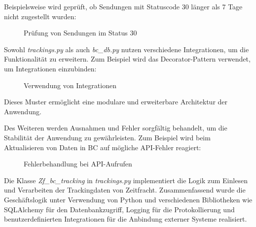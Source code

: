 Beispielsweise wird geprüft, ob Sendungen mit Statuscode 30 länger als 7 Tage nicht zugestellt wurden:

\begin{figure}[htb]
    \centering
    \caption{Prüfung von Sendungen im Status 30}
    \label{fig:viewStatus}
\end{figure}


Sowohl \textit{trackings.py} als auch \textit{bc\_db.py} nutzen verschiedene Integrationen, um die Funktionalität zu erweitern. 
Zum Beispiel wird das Decorator-Pattern verwendet, um Integrationen einzubinden:

\begin{figure}[htb]
    \centering
    \caption{Verwendung von Integrationen}
    \label{fig:Integrationen}
\end{figure}


Dieses Muster ermöglicht eine modulare und erweiterbare Architektur der Anwendung.



Des Weiteren werden Ausnahmen und Fehler sorgfältig behandelt, um die Stabilität der Anwendung zu gewährleisten. 
Zum Beispiel wird beim Aktualisieren von Daten in BC auf mögliche API-Fehler reagiert:

\begin{figure}[htb]
    \centering
    \caption{Fehlerbehandlung bei API-Aufrufen}
    \label{fig:viewAPI}
\end{figure}

Die Klasse \textit{Zf\_bc\_tracking} in \textit{trackings.py} implementiert die Logik zum Einlesen und Verarbeiten der Trackingdaten 
von Zeitfracht. Zusammenfassend wurde die Geschäftslogik unter Verwendung von Python und verschiedenen Bibliotheken wie SQLAlchemy 
für den Datenbankzugriff, Logging für die Protokollierung und benutzerdefinierten Integrationen für die Anbindung externer Systeme realisiert.


























